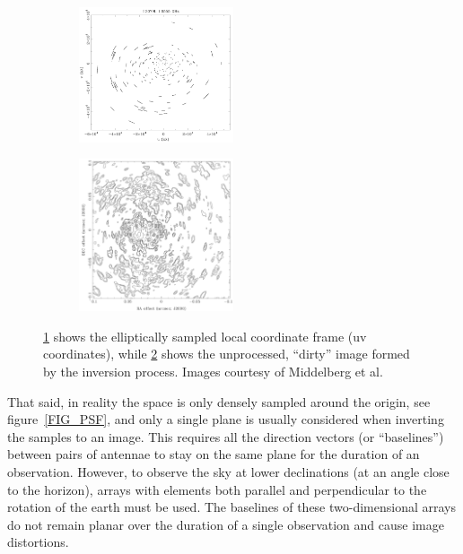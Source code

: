 \documentclass[a4paper, two column]{article}
\begin{document}
\begin{figure}[h]
 \begin{mdframed}
  \begin{subfigure}[b]{\textwidth}
   \centering
   \includegraphics[width=0.5\textwidth]{uv_space.png}
   \caption{}
   \label{FIG_IMAGE_FORMATION_A}
  \end{subfigure}
  \begin{subfigure}[b]{\textwidth}
   \centering
   \includegraphics[width=0.5\textwidth]{lm_space.png}
   \caption{}
   \label{FIG_IMAGE_FORMATION_B}
  \end{subfigure}
  \caption[Sampled uv space and its image]{\ref{FIG_IMAGE_FORMATION_A} shows the elliptically sampled local coordinate frame (uv coordinates), while \ref{FIG_IMAGE_FORMATION_B} shows the 
					   unprocessed, ``dirty'' image formed by the inversion process. Images courtesy of Middelberg et al. \cite{middelberg2008high}}
  \label{FIG_IMAGE_FORMATION}
 \end{mdframed}
\end{figure}

That said, in reality the space is only densely sampled around the origin, see figure~\ref{FIG_PSF}, and only a single plane is usually considered when inverting the samples to an image. This 
requires all the direction vectors (or ``baselines'') between pairs of antennae to stay on the same plane for the duration of an observation. However, to observe the sky at lower declinations 
(at an angle close to the horizon), arrays with elements both parallel and perpendicular to the rotation of the earth must be used. The baselines of these two-dimensional arrays do not remain 
planar over the duration of a single observation and cause image distortions. 
\end{document}
